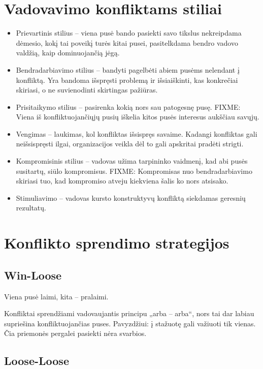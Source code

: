\section{Vadovavimo konfliktams stiliai}

\begin{itemize}
  \item Prievartinis stilius – viena pusė bando pasiekti savo
    tikslus nekreipdama dėmesio, kokį tai poveikį turės kitai
    pusei, pasitelkdama bendro vadovo valdžią, kaip dominuojančią
    jėgą.
  \item Bendradarbiavimo stilius – bandyti pagelbėti abiem pusėms
    nelendant į konfliktą. Yra bandoma išspręsti problemą ir
    išsiaiškinti, kas konkrečiai skiriasi, o ne suvienodinti skirtingas
    pažiūras.
  \item Prisitaikymo stilius – pasirenka kokią nors sau patogesnę
    pusę. FIXME: Viena iš konfliktuojančiųjų pusių iškelia kitos
    pusės interesus aukščiau savųjų.
  \item Vengimas – laukimas, kol konfliktas išsispręs savaime. Kadangi
    konfliktas gali neišsispręsti ilgai, organizacijos veikla dėl to
    gali apskritai pradėti strigti.
  \item Kompromisinis stilius – vadovas užima tarpininko vaidmenį, kad
    abi pusės susitartų, siūlo kompromisus. FIXME: Kompromisas nuo
    bendradarbiavimo skiriasi tuo, kad kompromiso atveju kiekviena
    šalis ko nors atsisako.
  \item Stimuliavimo – vadovas kursto konstruktyvų konfliktą siekdamas
    geresnių rezultatų.
\end{itemize}

\section{Konflikto sprendimo strategijos}

\subsection{Win-Loose}

Viena pusė laimi, kita – pralaimi.

Konfliktai sprendžiami vadovaujantis principu „arba – arba“, nors tai
dar labiau supriešina konfliktuojančias puses. Pavyzdžiui: į stažuotę
gali važiuoti tik vienas. Čia priemonės pergalei pasiekti nėra
svarbios.

\subsection{Loose-Loose}

